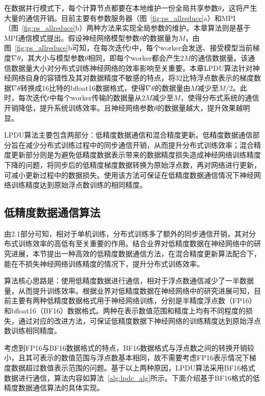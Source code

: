 在数据并行模式下，每个计算节点都要在本地维护一份全局共享参数$\theta$，这将产生大量的通信开销。目前主要有参数服务器（图~\ref{fig:ps_allreduce}a）和MPI（图~\ref{fig:ps_allreduce}b）两种方法来实现全局参数的维护。本章算法则是基于MPI通信模式提出。假设神经网络模型参数$\theta$的数据量为$M$，由图~\ref{fig:ps_allreduce}b可知，在每次迭代$t$中，每个worker会发送、接受模型当前梯度$\nabla\theta$，其大小与模型参数$\theta$相同，即每个worker都会产生$2M$的通信数据量。该通信数据量大小对分布式训练神经网络的效率影响至关重要。本章LPDU算法针对神经网络自身的容错性及其对数据精度不敏感的特点，将32比特浮点数表示的梯度数据$\nabla\theta$转换成16比特的bfloat16数据格式，使得$\nabla\theta$的数据量由$M$减少至$M/2$。此时，每次迭代$t$中每个worker传输的数据量从$2M$减少至$M$，使得分布式系统的通信开销降低，提升系统训练效率。且神经网络参数$\theta$的数据量越大，提升效果越明显。

LPDU算法主要包含两部分：低精度数据通信和混合精度更新。低精度数据通信部分旨在减少分布式训练过程中的同步通信开销，从而提升分布式训练效率；混合精度更新部分则是为避免低精度数据表示带来的数据精度损失造成神经网络训练精度下降的问题，将同步后的低精度梯度数据转换为原始浮点数，再对网络进行更新，可减小更新过程中的数据损失。使用该方法可保证在低精度数据通信情况下神经网络训练精度达到原始浮点数训练的相同精度。
\subsection{低精度数据通信算法}

由2.1部分可知，相对于单机训练，分布式训练多了额外的同步通信开销，其对分布式训练效率的高低有至关重要的作用。结合业界对低精度数据在神经网络中的研究进展，本节提出一种高效的低精度数据通信方法，在混合精度更新算法配合下，能在不损失神经网络训练精度的情况下，提升分布式训练效率。

算法核心思路是：使用低精度数据进行通信，相对于浮点数通信减少了一半数据量，从而提升训练效率。根据业界对低精度数据在神经网络中的研究进展可知，目前主要有两种低精度数据格式用于神经网络训练，分别是半精度浮点数（FP16）和bfloat16（BF16）数据格式。两种在表示数值范围和精度上均有不同程度的损失，通过对应的改进方法，可保证低精度数据下神经网络的训练精度达到原始浮点数训练相同精度。

考虑到FP16与BF16数据格式的特点，BF16数据格式与浮点数之间的转换开销较小，且其可表示的数值范围与浮点数基本相同，故不需要考虑FP16表示情况下梯度数据超过数值表示范围的问题。基于以上两种原因，LPDU算法采用BF16格式数据进行通信，算法内容如算法~\ref{alg:lpdc_alg}所示。下面介绍基于BF16格式的低精度数据通信算法的具体实现。

